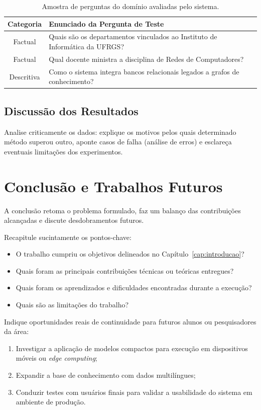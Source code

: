 \documentclass[cic,tc,biblatex]{iiufrgs}
\begin{document}
\begin{table}[htbp]
    \centering
    \caption{Amostra de perguntas do domínio avaliadas pelo sistema.}
    \label{tab:perguntas_amostra}
    \begin{tabular}{cp{10.5cm}}
        \toprule
        \textbf{Categoria} & \textbf{Enunciado da Pergunta de Teste} \\
        \midrule
        Factual & Quais são os departamentos vinculados ao Instituto de Informática da UFRGS? \\
        Factual & Qual docente ministra a disciplina de Redes de Computadores? \\
        Descritiva & Como o sistema integra bancos relacionais legados a grafos de conhecimento? \\
        \bottomrule
    \end{tabular}
\end{table}

\section{Discussão dos Resultados}
Analise criticamente os dados: explique os motivos pelos quais determinado método superou outro, aponte casos de falha (análise de erros) e esclareça eventuais limitações dos experimentos.

\chapter{Conclusão e Trabalhos Futuros}
\label{cap:conclusao}

A conclusão retoma o problema formulado, faz um balanço das contribuições alcançadas e discute desdobramentos futuros.

Recapitule sucintamente os pontos-chave:
\begin{itemize}
    \item O trabalho cumpriu os objetivos delineados no Capítulo~\ref{cap:introducao}?
    \item Quais foram as principais contribuições técnicas ou teóricas entregues?
    \item Quais foram os aprendizados e dificuldades encontradas durante a execução?
    \item Quais são as limitações do trabalho?
\end{itemize}

Indique oportunidades reais de continuidade para futuros alunos ou pesquisadores da área:
\begin{enumerate}
    \item Investigar a aplicação de modelos compactos para execução em dispositivos móveis ou \emph{edge computing};
    \item Expandir a base de conhecimento com dados multilíngues;
    \item Conduzir testes com usuários finais para validar a usabilidade do sistema em ambiente de produção.
\end{enumerate}
\end{document}
